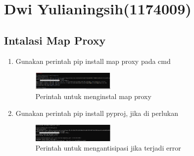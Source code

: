 \section{Dwi Yulianingsih(1174009)}
\subsection{Intalasi Map Proxy}
\begin{enumerate}
    \item Gunakan perintah pip install map proxy pada cmd
    \hfill\break
    \begin{figure}[H]
		\includegraphics[width=4cm]{figures/1174009/5/Capture.png}
		\centering
		\caption{Perintah untuk menginstal map proxy}
    \end{figure}
    \item Gunakan perintah pip install pyproj, jika di perlukan
    \hfill\break
    \begin{figure}[H]
		\includegraphics[width=4cm]{figures/1174009/5/Capture2.png}
		\centering
		\caption{Perintah untuk mengantisipasi jika terjadi error}
    \end{figure}
\end{enumerate}
